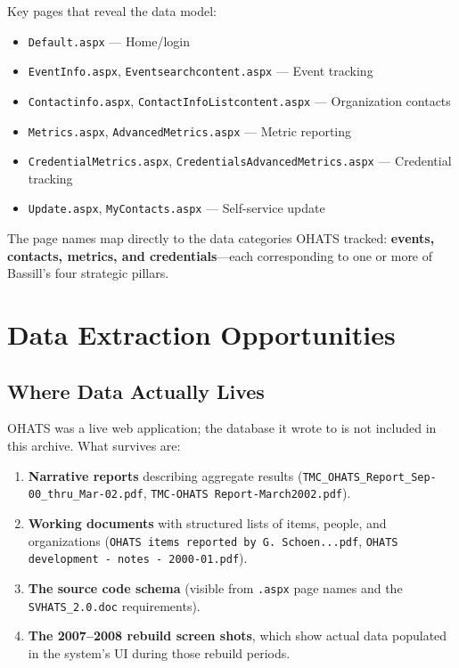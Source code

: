 \documentclass[12pt]{article}
\begin{document}
Key pages that reveal the data model:
\begin{itemize}[leftmargin=1.5em]
  \item \texttt{Default.aspx} — Home/login
  \item \texttt{EventInfo.aspx}, \texttt{Eventsearchcontent.aspx} — Event tracking
  \item \texttt{Contactinfo.aspx}, \texttt{ContactInfoListcontent.aspx} — Organization contacts
  \item \texttt{Metrics.aspx}, \texttt{AdvancedMetrics.aspx} — Metric reporting
  \item \texttt{CredentialMetrics.aspx}, \texttt{CredentialsAdvancedMetrics.aspx} — Credential tracking
  \item \texttt{Update.aspx}, \texttt{MyContacts.aspx} — Self-service update
\end{itemize}

The page names map directly to the data categories OHATS tracked:
\textbf{events, contacts, metrics, and credentials}---each corresponding
to one or more of Bassill's four strategic pillars.

\section{Data Extraction Opportunities}

\subsection{Where Data Actually Lives}

OHATS was a live web application; the database it wrote to is not included
in this archive. What survives are:

\begin{enumerate}[leftmargin=1.5em]
  \item \textbf{Narrative reports} describing aggregate results
        (\texttt{TMC\_OHATS\_Report\_Sep-00\_thru\_Mar-02.pdf},
        \texttt{TMC-OHATS Report-March2002.pdf}).
  \item \textbf{Working documents} with structured lists of items, people,
        and organizations (\texttt{OHATS items reported by G.~Schoen...pdf},
        \texttt{OHATS development - notes - 2000-01.pdf}).
  \item \textbf{The source code schema} (visible from \texttt{.aspx} page names
        and the \texttt{SVHATS\_2.0.doc} requirements).
  \item \textbf{The 2007--2008 rebuild screen shots}, which show actual data
        populated in the system's UI during those rebuild periods.
\end{enumerate}
\end{document}
